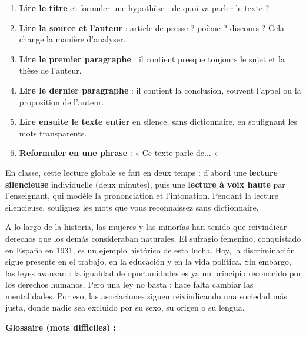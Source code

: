 \documentclass[11pt]{article}
\newcounter{popsec}
\newcounter{popsub}
\newcommand{\courssub}[1]{%
  \stepcounter{popsub}%
  \par\vspace{9pt}\noindent{\popxbold\fontsize{11.5}{13}\selectfont\color{popink}{\color{poporange}\thepopsec.\thepopsub}\hspace{6pt}#1}\par\nopagebreak\vspace{4pt}
}
\begin{document}
\begin{methode}
\begin{enumerate}
\item \textbf{Lire le titre} et formuler une hypothèse : de quoi va parler le texte ?
\item \textbf{Lire la source et l'auteur} : article de presse ? poème ? discours ? Cela change la manière d'analyser.
\item \textbf{Lire le premier paragraphe} : il contient presque toujours le sujet et la thèse de l'auteur.
\item \textbf{Lire le dernier paragraphe} : il contient la conclusion, souvent l'appel ou la proposition de l'auteur.
\item \textbf{Lire ensuite le texte entier} en silence, sans dictionnaire, en soulignant les mots transparents.
\item \textbf{Reformuler en une phrase} : « Ce texte parle de... »
\end{enumerate}
\end{methode}

En classe, cette lecture globale se fait en deux temps : d'abord une \textbf{lecture silencieuse} individuelle (deux minutes), puis une \textbf{lecture à voix haute} par l'enseignant, qui modèle la prononciation et l'intonation. Pendant la lecture silencieuse, soulignez les mots que vous reconnaissez sans dictionnaire.

\courssub{Le texte}

\begin{textebox}
A lo largo de la historia, las mujeres y las minorías han tenido que reivindicar derechos que los demás consideraban naturales. El sufragio femenino, conquistado en España en 1931, es un ejemplo histórico de esta lucha. Hoy, la discriminación sigue presente en el trabajo, en la educación y en la vida política. Sin embargo, las leyes avanzan : la igualdad de oportunidades es ya un principio reconocido por los derechos humanos. Pero una ley no basta : hace falta cambiar las mentalidades. Por eso, las asociaciones siguen reivindicando una sociedad más justa, donde nadie sea excluido por su sexo, su origen o su lengua.
\end{textebox}

\textbf{Glossaire (mots difficiles) :}
\end{document}

